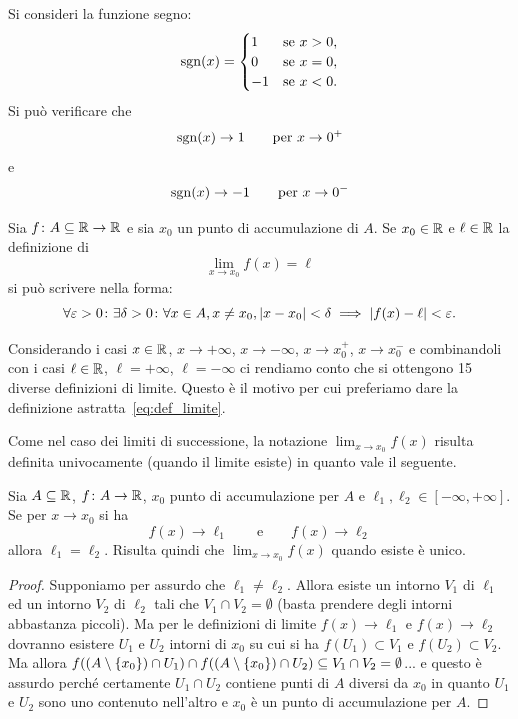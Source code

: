 \begin{example}
Si consideri la funzione segno:
\[
\operatorname{sgn}(x) =
\begin{cases}
  1 & \text{se $x>0$},\\
  0 & \text{se $x=0$},\\
  -1 & \text{se $x<0$}.
\end{cases}
\]
Si può verificare che
\[
\operatorname{sgn}(x) \to 1 \qquad \text{per $x\to 0^+$}
\]
e
\[
\operatorname{sgn}(x) \to -1 \qquad \text{per $x\to 0^-$}
\]
\end{example}

\begin{remark}
Sia $f\colon A\subseteq \mathbb R \to \mathbb R$ e sia $x_0$ un punto di accumulazione di $A$.
Se $x_0 \in \mathbb R$ e $\ell \in \mathbb R$ la definizione di
\[
   \lim_{x\to x_0} f(x) = \ell
\]
si può scrivere nella forma:
\[
  \forall \varepsilon>0\colon \exists\delta >0 \colon \forall x\in A, x\neq x_0, {\left|x-x_0\right|}< \delta \implies {\left|f(x)-\ell\right|}< \varepsilon.
\]

Considerando i casi $x\in \mathbb R$, $x\to +\infty$, $x\to -\infty$, $x\to x_0^+$, $x\to x_0^-$ e combinandoli con i casi $\ell\in \mathbb R$, $\ell=+\infty$, $\ell=-\infty$ ci rendiamo conto che si ottengono 15 diverse definizioni di limite. Questo è il motivo per cui preferiamo dare la definizione astratta~\eqref{eq:def_limite}.
\end{remark}

Come nel caso dei limiti di successione, la notazione $\lim_{x\to x_0} f(x)$ risulta definita univocamente (quando il limite esiste)
in quanto vale il seguente.

\begin{theorem}
\mymark{*}
Sia $A\subseteq \mathbb R$, $f\colon A \to \mathbb R$, $x_0$
punto di accumulazione per $A$ e $\ell_1, \ell_2\in [-\infty,+\infty]$.
Se per $x\to x_0$ si ha
\[
  f(x) \to \ell_1 \qquad\text{e}\qquad f(x) \to \ell_2
\]
allora $\ell_1=\ell_2$.
Risulta quindi che $\displaystyle \lim_{x\to x_0} f(x)$ quando esiste è unico.
\end{theorem}
%
\begin{proof}
\mymark{*}
Supponiamo per assurdo che $\ell_1\neq \ell_2$.
Allora esiste un intorno $V_1$ di $\ell_1$ ed un intorno $V_2$ di $\ell_2$
tali che $V_1\cap V_2 = \emptyset$ (basta prendere degli intorni abbastanza piccoli). Ma per le definizioni di limite $f(x)\to \ell_1$ e $f(x)\to \ell_2$ dovranno esistere $U_1$ e $U_2$ intorni di $x_0$ su cui si ha $f(U_1)\subset V_1$ e $f(U_2)\subset V_2$. Ma allora $f((A\setminus{\left\{ x_0 \right\}})\cap U_1)\cap f((A\setminus{\left\{ x_0 \right\}})\cap U_2)\subseteq V_1\cap V_2 = \emptyset$... e questo è assurdo perché certamente $U_1\cap U_2$ contiene punti di $A$ diversi da $x_0$ in quanto $U_1$ e $U_2$ sono uno contenuto nell'altro e $x_0$ è un punto di accumulazione per $A$.
\end{proof}

